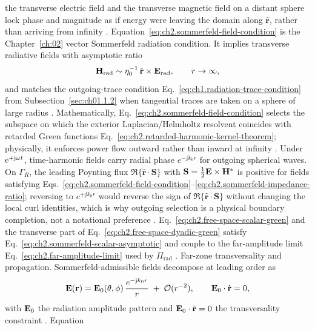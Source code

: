 the transverse electric field and the transverse magnetic field on a distant sphere lock
phase and magnitude as if energy were leaving the domain along \(\hat{\mathbf{r}}\), rather
than arriving from infinity \cite{harrington2001}. Equation~\eqref{eq:ch2.sommerfeld-field-condition}
is the Chapter~\ref{ch:02} vector Sommerfeld radiation condition. It implies
transverse radiative fields with asymptotic ratio
\begin{equation}
\label{eq:ch2.sommerfeld-impedance-ratio}
\mathbf{H}_{\mathrm{rad}}
\sim
\eta_0^{-1}\,\hat{\mathbf{r}}\times\mathbf{E}_{\mathrm{rad}},
\qquad
r\to\infty,
\end{equation}
and matches the outgoing-trace condition Eq.~\eqref{eq:ch1.radiation-trace-condition}
from Subsection~\ref{sec:ch01.1.2} when tangential traces are taken on a sphere of
large radius \cite{stratton1941}. Mathematically,
Eq.~\eqref{eq:ch2.sommerfeld-field-condition} selects the subspace on which the
exterior Laplacian/Helmholtz resolvent coincides with retarded Green functions
Eq.~\eqref{eq:ch2.retarded-harmonic-kernel-theorem}; physically, it enforces
power flow outward rather than inward at infinity \cite{harrington2001}.
Under $\mathrm{e}^{+\mathrm{j}\omega t}$, time-harmonic fields carry radial phase $e^{-\jj k_0 r}$ for outgoing spherical waves.
On $\Gamma_R$, the leading Poynting flux $\Re\{\hat{\mathbf{r}}\cdot\mathbf{S}\}$ with
$\mathbf{S}=\tfrac12\mathbf{E}\times\mathbf{H}^*$ is positive for fields satisfying
Eqs.~\eqref{eq:ch2.sommerfeld-field-condition}--\eqref{eq:ch2.sommerfeld-impedance-ratio};
reversing to $e^{+\jj k_0 r}$ would reverse the sign of $\Re\{\hat{\mathbf{r}}\cdot\mathbf{S}\}$
without changing the local curl identities, which is why outgoing selection is a physical
boundary completion, not a notational preference \cite{poynting1884,jackson1999}.
Eq.~\eqref{eq:ch2.free-space-scalar-green} and the transverse part of
Eq.~\eqref{eq:ch2.free-space-dyadic-green} satisfy Eq.~\eqref{eq:ch2.sommerfeld-scalar-asymptotic} and couple to
the far-amplitude limit Eq.~\eqref{eq:ch2.far-amplitude-limit} used by $\Pi_{\mathrm{rad}}$
\cite{stratton1941}.
Far-zone transversality and propagation. Sommerfeld-admissible fields decompose at leading order as
\begin{equation}
\label{eq:ch2.far-zone-transverse-radiation}
\mathbf{E}(\mathbf{r})
=
\mathbf{E}_0(\theta,\phi)\,\frac{e^{-\mathrm{j} k_0 r}}{r}
\;+\;\mathcal{O}(r^{-2}),
\qquad
\mathbf{E}_0\cdot\hat{\mathbf{r}}=0,
\end{equation}
with \(\mathbf{E}_0\) the radiation amplitude pattern and \(\mathbf{E}_0\cdot\hat{\mathbf{r}}=0\)
the transversality constraint \cite{stratton1941}. Equation

